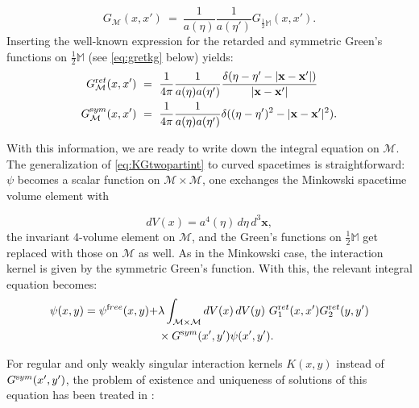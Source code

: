 \documentclass[b5paper,draft,openbib,12pt]{memoir}
\newcommand{\M}{\mathbb{M}}
\newcommand{\vx}{\mathbf{x}}
\newcommand{\ret}{{\textup ret}}
\newcommand{\sym}{{\textup sym}}
\newcommand{\free}{{\textup free}}
\begin{document}
\begin{equation}
	G_{\mathcal{M}}(x,x') ~=~ \frac{1}{a(\eta)} \frac{1}{a(\eta')} G_{\frac{1}{2}\M}(x,x').
\end{equation}
Inserting the well-known expression for the retarded and symmetric 
Green's functions on $\tfrac{1}{2}\M$ (see \eqref{eq:gretkg} below) 
yields:
\begin{align}
	G_{\mathcal{M}}^\ret(x,x') ~&=~ \frac{1}{4\pi} \frac{1}{a(\eta) a(\eta')} \frac{\delta(\eta - \eta' -|\vx-\vx'|)}{|\vx-\vx'|}\nonumber\\
G_{\mathcal{M}}^\sym(x,x') ~&=~ \frac{1}{4\pi} \frac{1}{a(\eta) a(\eta')} \delta((\eta-\eta')^2-|\vx-\vx'|^2).
\end{align}

With this information, we are ready to write down the integral 
equation on $\mathcal{M}$. The generalization of \eqref{eq:KGtwopartint} 
to curved spacetimes is straightforward: $\psi$ becomes a scalar 
function on $\mathcal{M}\times\mathcal{M}$, one exchanges the 
Minkowski spacetime volume element with 

\begin{equation}
	dV(x) = a^4(\eta) \, d\eta \, d^3 \vx,
\end{equation}
the invariant 4-volume 
element on $\mathcal{M}$, and the Green's functions on 
$\tfrac{1}{2}\M$ get replaced with those on $\mathcal{M}$ as well. 
As in the Minkowski case, the interaction kernel is given by the 
symmetric Green's function. With this, the relevant integral 
equation becomes:
\begin{align}\notag
  \psi(x,y) = \psi^\free(x,y) +& \lambda \int_{\mathcal{M}\times \mathcal{M}} dV(x) \, dV(y)~G_1^\ret(x,x')G_2^\ret(y,y') \\
  & \times G^\sym(x',y') \psi(x',y').
	\label{eq:inteqcurved}
\end{align}

For regular and only weakly singular interaction kernels $K(x,y)$ 
instead of $G^\sym(x',y')$, the problem of existence and uniqueness 
of solutions of this equation has been treated in 
\cite{lienertcurved}:
\end{document}
